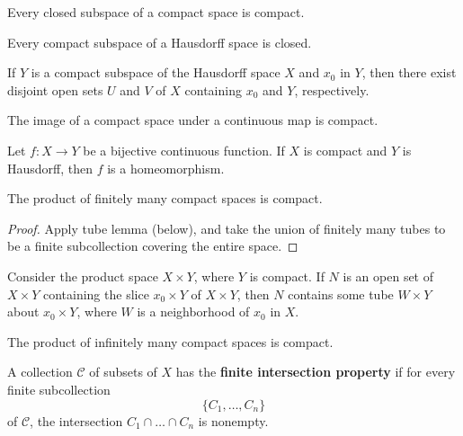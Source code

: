 \begin{theorem}
Every closed subspace of a compact space is compact.
\end{theorem}

\begin{theorem}
Every compact subspace of a Hausdorff space is closed.
\end{theorem}

\begin{lemma}
If $Y$ is a compact subspace of the Hausdorff space $X$ and $x_0$ in $Y$, then there exist disjoint open sets $U$ and $V$ of $X$ containing $x_0$ and $Y$, respectively. 
\end{lemma}

\begin{theorem}
The image of a compact space under a continuous map is compact.
\end{theorem}

\begin{theorem}
Let $f\colon X \rightarrow Y$ be a bijective continuous function. If $X$ is compact and $Y$ is Hausdorff, then $f$ is a homeomorphism.
\end{theorem}

\begin{theorem}
The product of finitely many compact spaces is compact.
\end{theorem}

\begin{proof}
Apply tube lemma (below), and take the union of finitely many tubes to be a finite subcollection covering the entire space.
\end{proof}

\begin{lemma}
Consider the product space $X \times Y$, where $Y$ is compact. If $N$ is an open set of $X \times Y$ containing the slice $x_0 \times Y$ of $X \times Y$, then $N$
contains some tube $W \times Y$ about $x_0 \times Y$, where $W$ is a neighborhood of $x_0$ in $X$.    
\end{lemma}

\begin{theorem}
The product of infinitely many compact spaces is compact.
\end{theorem}

\begin{definition}
A collection $\mathscr{C}$ of subsets of $X$ has the \textbf{finite intersection property} if for every finite subcollection 
\[
    \{ C_1, \dots, C_n \} 
\]
of $\mathscr{C}$, the intersection $C_1 \cap \dots \cap C_n$ is nonempty.
\end{definition}


